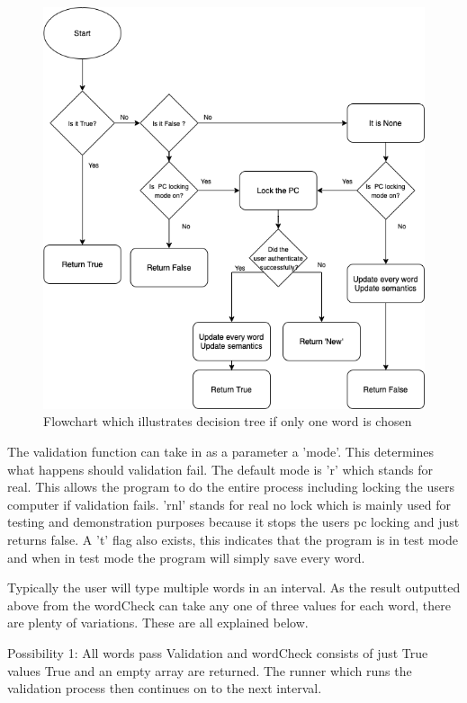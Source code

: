 \documentclass[10pt,a4paper]{report}
\begin{document}
\begin{figure}[h]
	\centering
	\includegraphics[scale=0.4]{IfLen1}
	\caption{Flowchart which illustrates decision tree if only one word is chosen}
	\label{fig:If1}
\end{figure}

The validation function can take in as a parameter a 'mode'. This determines what happens should validation fail. The default mode is 'r' which stands for real. This allows the program to do the entire process including locking the users computer if validation fails. 'rnl' stands for real no lock which is mainly used for testing and demonstration purposes because it stops the users pc locking and just returns false. A 't' flag also exists, this indicates that the program is in test mode and when in test mode the program will simply save every word.

Typically the user will type multiple words in an interval. As the result outputted above from the wordCheck can take any one of three values for each word, there are plenty of variations. These are all explained below.

Possibility 1: All words pass Validation and wordCheck consists of just True values
True and an empty array are returned. The runner which runs the validation process then continues on to the next interval.
\end{document}
